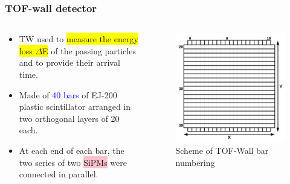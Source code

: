 \begin{frame} [fragile]
	\frametitle{TOF-wall detector}
	\begin{columns}
  		\begin{column}{0.50\textwidth}
            \begin{itemize}
                \item TW used to \colorbox{yellow}{measure the energy loss $\Delta$E} of the passing particles and to provide their arrival time.
                \item Made of \textcolor{blue}{40 bars} of EJ-200 plastic scintillator arranged in two orthogonal layers of 20 each.
                \item At each end of each bar, the two series of two \colorbox{pink}{SiPMs} were connected in parallel.
            \end{itemize}
		\end{column}
    \begin{column}{0.50\textwidth}
 		\newline
			\begin{figure}
	  		    \centering
				\includegraphics[scale=0.15]{figures/tof_wall_scheme.png}
                \caption{Scheme of TOF-Wall bar numbering}
			\end{figure}
    \end{column}
\end{columns}
\end{frame}